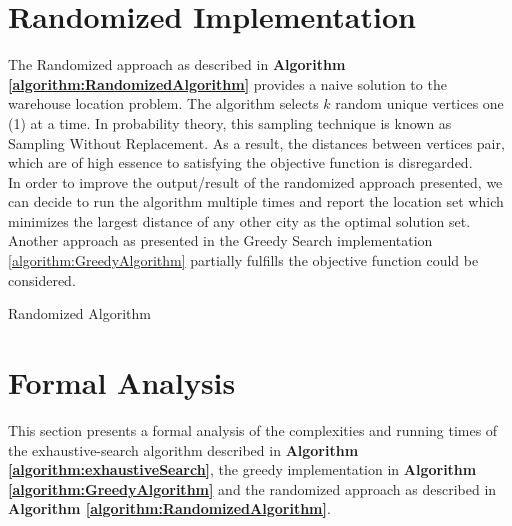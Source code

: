 \documentclass[longpaper, english, final, times]{revdetua}
\begin{document}
	
	\section{\label{outline:randomized} Randomized Implementation}
	
		The Randomized approach as described in \textbf{Algorithm \ref{algorithm:RandomizedAlgorithm}} provides a naive solution to the warehouse location problem. The algorithm selects $k$ random unique vertices one (1) at a time. In probability theory, this sampling technique is known as Sampling Without Replacement. As a result, the distances between vertices pair, which are of high essence to satisfying the objective function is disregarded. \\
		
		In order to improve the output/result of the randomized approach presented, we can decide to run the algorithm multiple times and report the location set which minimizes the largest distance of any other city as the optimal solution set. Another approach as presented in the Greedy Search implementation \ref{algorithm:GreedyAlgorithm} partially fulfills the objective function could be considered.
		
		\begin{algorithm}[h]
			\caption{Randomized Algorithm}
			\label{algorithm:RandomizedAlgorithm}
			\DontPrintSemicolon
			
			
			
			
		\end{algorithm}
		
	\section{\label{outline:formal-analysis} Formal Analysis}
		This section presents a formal analysis of the complexities and running times of the exhaustive-search algorithm described in \textbf{Algorithm \ref{algorithm:exhaustiveSearch}}, the greedy implementation in \textbf{Algorithm \ref{algorithm:GreedyAlgorithm}} and the randomized approach as described in \textbf{Algorithm \ref{algorithm:RandomizedAlgorithm}}.
		
\end{document}
